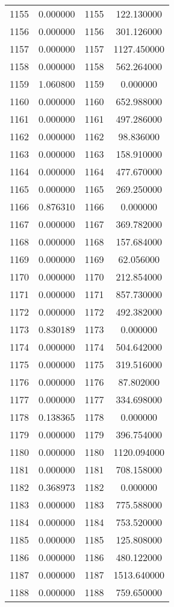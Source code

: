 \documentclass[12pt]{article}
\begin{document}
\begin{longtable}{@{}cccc@{}}
1155 & 0.000000 & 1155 & 122.130000 \\
1156 & 0.000000 & 1156 & 301.126000 \\
1157 & 0.000000 & 1157 & 1127.450000 \\
1158 & 0.000000 & 1158 & 562.264000 \\
1159 & 1.060800 & 1159 & 0.000000 \\
1160 & 0.000000 & 1160 & 652.988000 \\
1161 & 0.000000 & 1161 & 497.286000 \\
1162 & 0.000000 & 1162 & 98.836000 \\
1163 & 0.000000 & 1163 & 158.910000 \\
1164 & 0.000000 & 1164 & 477.670000 \\
1165 & 0.000000 & 1165 & 269.250000 \\
1166 & 0.876310 & 1166 & 0.000000 \\
1167 & 0.000000 & 1167 & 369.782000 \\
1168 & 0.000000 & 1168 & 157.684000 \\
1169 & 0.000000 & 1169 & 62.056000 \\
1170 & 0.000000 & 1170 & 212.854000 \\
1171 & 0.000000 & 1171 & 857.730000 \\
1172 & 0.000000 & 1172 & 492.382000 \\
1173 & 0.830189 & 1173 & 0.000000 \\
1174 & 0.000000 & 1174 & 504.642000 \\
1175 & 0.000000 & 1175 & 319.516000 \\
1176 & 0.000000 & 1176 & 87.802000 \\
1177 & 0.000000 & 1177 & 334.698000 \\
1178 & 0.138365 & 1178 & 0.000000 \\
1179 & 0.000000 & 1179 & 396.754000 \\
1180 & 0.000000 & 1180 & 1120.094000 \\
1181 & 0.000000 & 1181 & 708.158000 \\
1182 & 0.368973 & 1182 & 0.000000 \\
1183 & 0.000000 & 1183 & 775.588000 \\
1184 & 0.000000 & 1184 & 753.520000 \\
1185 & 0.000000 & 1185 & 125.808000 \\
1186 & 0.000000 & 1186 & 480.122000 \\
1187 & 0.000000 & 1187 & 1513.640000 \\
1188 & 0.000000 & 1188 & 759.650000 \\

\end{longtable}
\end{document}

